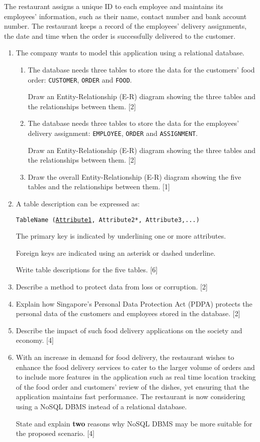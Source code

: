 The restaurant assigns a unique ID to each employee and maintains
its employees\textquoteright{} information, such as their name, contact
number and bank account number. The restaurant keeps a record of the
employees\textquoteright{} delivery assignments, the date and time
when the order is successfully delivered to the customer. 
\begin{enumerate}
\item The company wants to model this application using a relational database. 
\begin{enumerate}
\item The database needs three tables to store the data for the customers\textquoteright{}
food order: \texttt{CUSTOMER}, \texttt{ORDER} and \texttt{FOOD}. 

Draw an Entity-Relationship (E-R) diagram showing the three tables
and the relationships between them. \hfill{}{[}2{]}
\item The database needs three tables to store the data for the employees\textquoteright{}
delivery assignment: \texttt{EMPLOYEE}, \texttt{ORDER} and \texttt{ASSIGNMENT}. 

Draw an Entity-Relationship (E-R) diagram showing the three tables
and the relationships between them. \hfill{}{[}2{]}
\item Draw the overall Entity-Relationship (E-R) diagram showing the five
tables and the relationships between them. \hfill{}{[}1{]}
\end{enumerate}
\item A table description can be expressed as: 

\texttt{TableName (}\texttt{\uline{Attribute1}}\texttt{, Attribute2{*},
Attribute3,...)} 

The primary key is indicated by underlining one or more attributes. 

Foreign keys are indicated using an asterisk or dashed underline. 

Write table descriptions for the five tables.\hfill{} {[}6{]}
\item Describe a method to protect data from loss or corruption.\hfill{}
{[}2{]}
\item Explain how Singapore\textquoteright s Personal Data Protection Act
(PDPA) protects the personal data of the customers and employees stored
in the database. \hfill{}{[}2{]}
\item Describe the impact of such food delivery applications on the society
and economy.\hfill{} {[}4{]}
\item With an increase in demand for food delivery, the restaurant wishes
to enhance the food delivery services to cater to the larger volume
of orders and to include more features in the application such as
real time location tracking of the food order and customers\textquoteright{}
review of the dishes, yet ensuring that the application maintains
fast performance. The restaurant is now considering using a NoSQL
DBMS instead of a relational database. 

State and explain \textbf{two} reasons why NoSQL DBMS may be more
suitable for the proposed scenario.\hfill{} {[}4{]}
\end{enumerate}